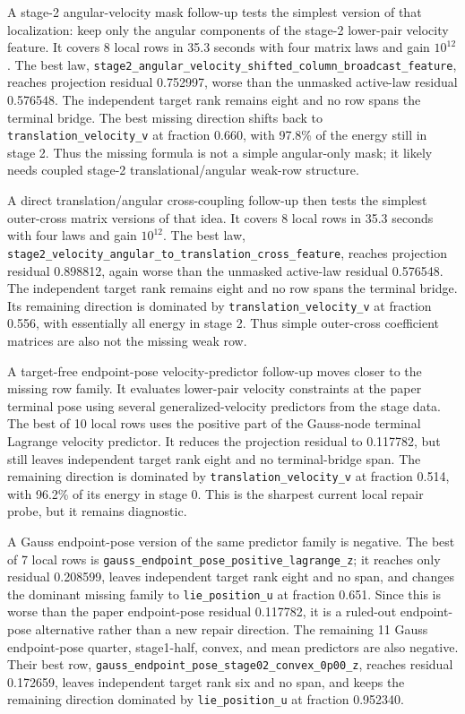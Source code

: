 \documentclass[11pt]{article}
\begin{document}
A stage-2 angular-velocity mask follow-up tests the simplest version of that
localization: keep only the angular components of the stage-2 lower-pair
velocity feature.  It covers 8 local rows in 35.3 seconds with four matrix
laws and gain $10^{12}$.  The best law,
\nolinkurl{stage2_angular_velocity_shifted_column_broadcast_feature}, reaches
projection residual 0.752997, worse than the unmasked active-law residual
0.576548.  The independent target rank remains eight and no row spans the
terminal bridge.  The best missing direction shifts back to
\nolinkurl{translation_velocity_v} at fraction 0.660, with 97.8\% of the
energy still in stage 2.  Thus the missing formula is not a simple angular-only
mask; it likely needs coupled stage-2 translational/angular weak-row
structure.

A direct translation/angular cross-coupling follow-up then tests the simplest
outer-cross matrix versions of that idea.  It covers 8 local rows in 35.3
seconds with four laws and gain $10^{12}$.  The best law,
\nolinkurl{stage2_velocity_angular_to_translation_cross_feature}, reaches
projection residual 0.898812, again worse than the unmasked active-law
residual 0.576548.  The independent target rank remains eight and no row spans
the terminal bridge.  Its remaining direction is dominated by
\nolinkurl{translation_velocity_v} at fraction 0.556, with essentially all
energy in stage 2.  Thus simple outer-cross coefficient matrices are also not
the missing weak row.

A target-free endpoint-pose velocity-predictor follow-up moves closer to the
missing row family.  It evaluates lower-pair velocity constraints at the paper
terminal pose using several generalized-velocity predictors from the stage
data.  The best of 10 local rows uses the positive part of the Gauss-node
terminal Lagrange velocity predictor.
It reduces the projection residual to 0.117782, but still leaves independent
target rank eight and no terminal-bridge span.  The remaining direction is
dominated by \nolinkurl{translation_velocity_v} at fraction 0.514, with 96.2\%
of its energy in stage 0.  This is the sharpest current local repair probe,
but it remains diagnostic.

A Gauss endpoint-pose version of the same predictor family is negative.  The
best of 7 local rows is
\nolinkurl{gauss_endpoint_pose_positive_lagrange_z}; it reaches only residual
0.208599, leaves independent target rank eight and no span, and changes the
dominant missing family to \nolinkurl{lie_position_u} at fraction 0.651.  Since
this is worse than the paper endpoint-pose residual 0.117782, it is a ruled-out
endpoint-pose alternative rather than a new repair direction.
The remaining 11 Gauss endpoint-pose quarter, stage1-half, convex, and mean
predictors are also negative.  Their best row,
\nolinkurl{gauss_endpoint_pose_stage02_convex_0p00_z}, reaches residual
0.172659, leaves independent target rank six and no span, and keeps the
remaining direction dominated by \nolinkurl{lie_position_u} at fraction
0.952340.
\end{document}
